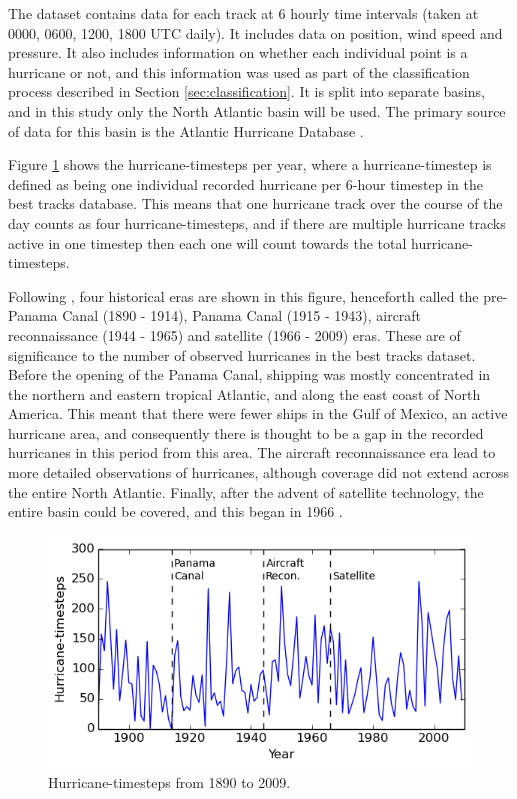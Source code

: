 \documentclass[pdftex,12pt,a4paper]{report}
\begin{document}
The dataset contains data for each track at 6 hourly time intervals (taken at 0000, 0600, 1200, 1800
UTC daily). It includes data on position, wind speed and pressure. It also includes information on
whether each individual point is a hurricane or not, and this information was used as part of the
classification process described in Section \ref{sec:classification}. It is split into separate
basins, and in this study only the North Atlantic basin will be used. The primary source of
data for this basin is the Atlantic Hurricane Database \parencite[HURDAT;][]{jarvinen1984tropical}.


Figure \ref{fig:hurr_per_year} shows the hurricane-timesteps per year, where a hurricane-timestep is
defined as being one individual recorded hurricane per 6-hour timestep in the best tracks database.
This means that one hurricane track over the course of the day counts as four hurricane-timesteps,
and if there are multiple hurricane tracks active in one timestep then each one will count towards
the total hurricane-timesteps. 

Following \textcite{vecchi2008estimates}, four historical eras are shown in this figure, henceforth
called the pre-Panama Canal (1890 - 1914), Panama Canal (1915 - 1943), aircraft reconnaissance (1944
- 1965) and satellite (1966 - 2009) eras.  These are of significance to the number of observed
hurricanes in the best tracks dataset. Before the opening of the Panama Canal, shipping was
mostly concentrated in the northern and eastern tropical Atlantic, and along the east coast of North
America. This meant that there were fewer ships in the Gulf of Mexico, an active hurricane area, and
consequently there is thought to be a gap in the recorded hurricanes in this period from this area.
The aircraft reconnaissance era lead to more detailed observations of hurricanes, although coverage
did not extend across the entire North Atlantic. Finally, after the advent of satellite technology,
the entire basin could be covered, and this began in 1966 \parencite{landsea2007counting}.

\begin{figure}[hb!]
    \centering
    \includegraphics[width=\textwidth]{figures/hurr_per_year}
    \caption{Hurricane-timesteps from 1890 to 2009.}
    \label{fig:hurr_per_year}
\end{figure}
\end{document}
